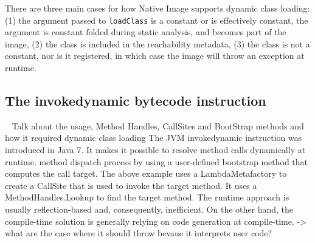 There are three main cases for how Native Image supports dynamic class loading: (1) the argument passed to \verb|loadClass| is a constant or is effectively constant, the argument is constant folded during static analysis, and becomes part of the image, (2) the class is included in the reachability metadata, (3) the class is not a constant, nor is it registered, in which case the image will throw an exception at runtime.


% 



\subsection{The invokedynamic bytecode instruction}

~\cite{rose_bytecodes_2009}
Talk about the usage, Method Handles, CallSites and BootStrap methods and how it required dynamic class loading
The JVM invokedynamic instruction was introduced in Java 7. It makes it possible to resolve method calls dynamically at runtime. method dispatch process by using a user-defined bootstrap method that computes the call target.
The above example uses a LambdaMetafactory to create a CallSite that is used to invoke the target method. It uses a MethodHandles.Lookup to find the target method.
The runtime approach is usually reflection-based and, consequently, inefficient. On the other hand, the compile-time solution is generally relying on code generation at compile-time. 
-> what are the case where it should throw bevaue it interprets user code?

